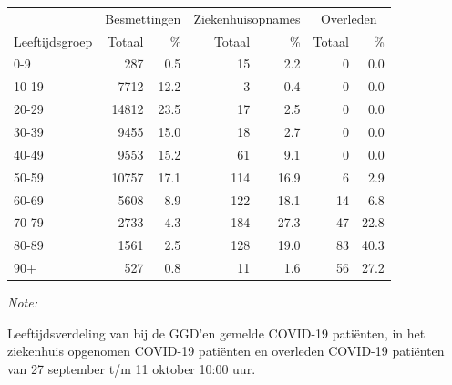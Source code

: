 \documentclass[
  english,
  man,floatsintext]{apa6}
\begin{document}
\begin{table}[H]
\centering\begingroup\fontsize{11}{13}\selectfont

\begin{threeparttable}
\begin{tabular}{lrrrrrr}
\toprule
\multicolumn{1}{c}{ } & \multicolumn{2}{c}{Besmettingen} & \multicolumn{2}{c}{Ziekenhuisopnames} & \multicolumn{2}{c}{Overleden} \\
\cmidrule(l{3pt}r{3pt}){2-3} \cmidrule(l{3pt}r{3pt}){4-5} \cmidrule(l{3pt}r{3pt}){6-7}
Leeftijdsgroep & Totaal & \% & Totaal & \% & Totaal & \%\\
\midrule
0-9 & 287 & 0.5 & 15 & 2.2 & 0 & 0.0\\
10-19 & 7712 & 12.2 & 3 & 0.4 & 0 & 0.0\\
20-29 & 14812 & 23.5 & 17 & 2.5 & 0 & 0.0\\
30-39 & 9455 & 15.0 & 18 & 2.7 & 0 & 0.0\\
40-49 & 9553 & 15.2 & 61 & 9.1 & 0 & 0.0\\
50-59 & 10757 & 17.1 & 114 & 16.9 & 6 & 2.9\\
60-69 & 5608 & 8.9 & 122 & 18.1 & 14 & 6.8\\
70-79 & 2733 & 4.3 & 184 & 27.3 & 47 & 22.8\\
80-89 & 1561 & 2.5 & 128 & 19.0 & 83 & 40.3\\
90+ & 527 & 0.8 & 11 & 1.6 & 56 & 27.2\\
\bottomrule
\end{tabular}
\begin{tablenotes}
\item \textit{Note: } 
\item Leeftijdsverdeling van bij de GGD’en gemelde COVID-19 patiënten, in het ziekenhuis opgenomen COVID-19 patiënten en overleden COVID-19 patiënten van 27 september t/m 11 oktober 10:00 uur.
\end{tablenotes}
\end{threeparttable}
\endgroup{}
\end{table}
\end{document}
